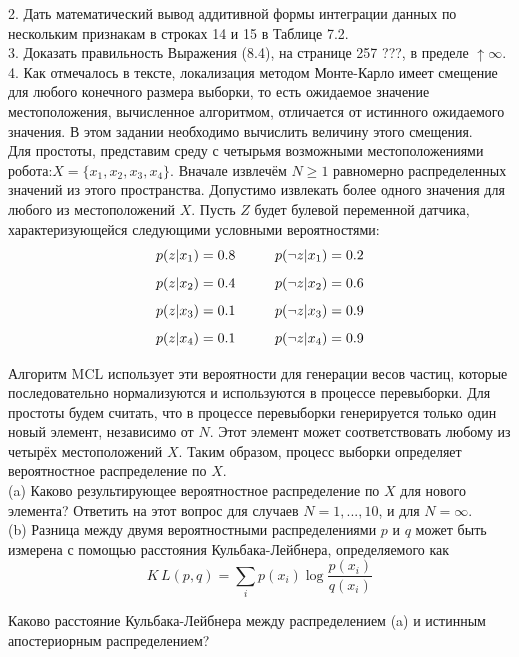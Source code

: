 \documentclass[10pt,a4paper]{article}
\begin{document}
2. Дать математический вывод аддитивной формы интеграции данных по нескольким признакам в строках 14 и 15 в Таблице 7.2.\\

3. Доказать правильность Выражения (8.4), на странице 257 ???, в пределе $\uparrow\infty$.\\

4. Как отмечалось в тексте, локализация методом Монте-Карло имеет смещение для любого конечного размера выборки, то есть ожидаемое значение местоположения, вычисленное алгоритмом, отличается от истинного ожидаемого значения. В этом задании необходимо вычислить величину этого смещения.\\

Для простоты, представим среду с четырьмя возможными местоположениями робота:$X=\{x_1, x_2, x_3, x_4\}$. Вначале извлечём $N\geq1$ равномерно распределенных значений из этого пространства. Допустимо извлекать более одного значения для любого из местоположений $X$. Пусть $Z$ будет булевой переменной датчика, характеризующейся следующими условными вероятностями:\\ 
$$p(z|x_1)=0.8\hspace{10mm}p(\neg z|x_1)=0.2$$
$$p(z|x_2)=0.4\hspace{10mm}p(\neg z|x_2)=0.6$$
$$p(z|x_3)=0.1\hspace{10mm}p(\neg z|x_3)=0.9$$
$$p(z|x_4)=0.1\hspace{10mm}p(\neg z|x_4)=0.9$$

Алгоритм MCL использует эти вероятности для генерации весов частиц, которые последовательно нормализуются и используются в процессе перевыборки. Для простоты будем считать, что в процессе перевыборки генерируется только один новый элемент, независимо от $N$. Этот элемент может соответствовать любому из четырёх местоположений $X$. Таким образом, процесс выборки определяет вероятностное распределение по $X$.\\

(a) Каково результирующее вероятностное распределение по $X$ для нового элемента? Ответить на этот вопрос для случаев $N = 1, . . . , 10$, и для $N=\infty$.\\

(b) Разница между  двумя вероятностными распределениями $p$ и $q$ может быть измерена с помощью расстояния Кульбака-Лейбнера, определяемого как \\

$$K\,L(p,q)=\sum_i p(x_i)\log\frac{p(x_i)}{q(x_i)}$$

Каково расстояние Кульбака-Лейбнера между распределением (a) и истинным апостериорным распределением?\\
\end{document}

